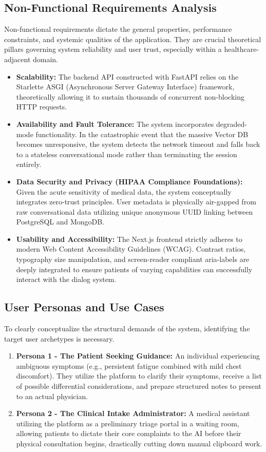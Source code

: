 \documentclass[12pt]{article}
\begin{document}
\subsection{Non-Functional Requirements Analysis}
Non-functional requirements dictate the general properties, performance constraints, and systemic qualities of the application. They are crucial theoretical pillars governing system reliability and user trust, especially within a healthcare-adjacent domain.
\begin{itemize}
    \item \textbf{Scalability:} The backend API constructed with FastAPI relies on the Starlette ASGI (Asynchronous Server Gateway Interface) framework, theoretically allowing it to sustain thousands of concurrent non-blocking HTTP requests.
    \item \textbf{Availability and Fault Tolerance:} The system incorporates degraded-mode functionality. In the catastrophic event that the massive Vector DB becomes unresponsive, the system detects the network timeout and falls back to a stateless conversational mode rather than terminating the session entirely.
    \item \textbf{Data Security and Privacy (HIPAA Compliance Foundations):} Given the acute sensitivity of medical data, the system conceptually integrates zero-trust principles. User metadata is physically air-gapped from raw conversational data utilizing unique anonymous UUID linking between PostgreSQL and MongoDB.
    \item \textbf{Usability and Accessibility:} The Next.js frontend strictly adheres to modern Web Content Accessibility Guidelines (WCAG). Contrast ratios, typography size manipulation, and screen-reader compliant aria-labels are deeply integrated to ensure patients of varying capabilities can successfully interact with the dialog system.
\end{itemize}

\subsection{User Personas and Use Cases}
To clearly conceptualize the structural demands of the system, identifying the target user archetypes is necessary.
\begin{enumerate}
    \item \textbf{Persona 1 - The Patient Seeking Guidance:} An individual experiencing ambiguous symptoms (e.g., persistent fatigue combined with mild chest discomfort). They utilize the platform to clarify their symptoms, receive a list of possible differential considerations, and prepare structured notes to present to an actual physician.
    \item \textbf{Persona 2 - The Clinical Intake Administrator:} A medical assistant utilizing the platform as a preliminary triage portal in a waiting room, allowing patients to dictate their core complaints to the AI before their physical consultation begins, drastically cutting down manual clipboard work.
\end{enumerate}
\end{document}
